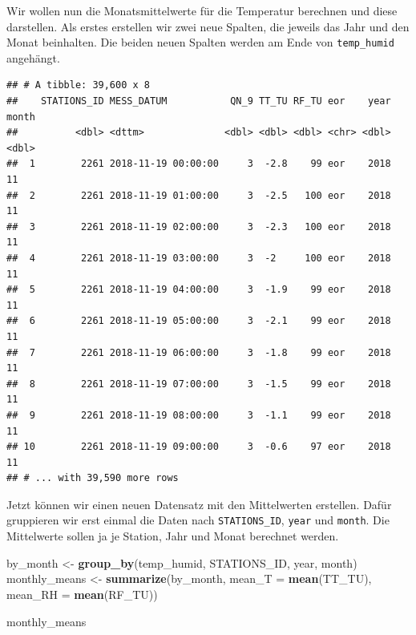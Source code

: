 \documentclass[]{book}
\newenvironment{Shaded}{\begin{snugshade}}{\end{snugshade}}
\newcommand{\DataTypeTok}[1]{\textcolor[rgb]{0.13,0.29,0.53}{#1}}
\newcommand{\KeywordTok}[1]{\textcolor[rgb]{0.13,0.29,0.53}{\textbf{#1}}}
\newcommand{\NormalTok}[1]{#1}
\newcommand{\OperatorTok}[1]{\textcolor[rgb]{0.81,0.36,0.00}{\textbf{#1}}}
\newcommand{\StringTok}[1]{\textcolor[rgb]{0.31,0.60,0.02}{#1}}
\begin{document}
Wir wollen nun die Monatsmittelwerte für die Temperatur berechnen und diese darstellen. Als erstes erstellen wir zwei neue Spalten, die jeweils das Jahr und den Monat beinhalten. Die beiden neuen Spalten werden am Ende von \texttt{temp\_humid} angehängt.

\begin{Shaded}
\end{Shaded}

\begin{verbatim}
## # A tibble: 39,600 x 8
##    STATIONS_ID MESS_DATUM           QN_9 TT_TU RF_TU eor    year month
##          <dbl> <dttm>              <dbl> <dbl> <dbl> <chr> <dbl> <dbl>
##  1        2261 2018-11-19 00:00:00     3  -2.8    99 eor    2018    11
##  2        2261 2018-11-19 01:00:00     3  -2.5   100 eor    2018    11
##  3        2261 2018-11-19 02:00:00     3  -2.3   100 eor    2018    11
##  4        2261 2018-11-19 03:00:00     3  -2     100 eor    2018    11
##  5        2261 2018-11-19 04:00:00     3  -1.9    99 eor    2018    11
##  6        2261 2018-11-19 05:00:00     3  -2.1    99 eor    2018    11
##  7        2261 2018-11-19 06:00:00     3  -1.8    99 eor    2018    11
##  8        2261 2018-11-19 07:00:00     3  -1.5    99 eor    2018    11
##  9        2261 2018-11-19 08:00:00     3  -1.1    99 eor    2018    11
## 10        2261 2018-11-19 09:00:00     3  -0.6    97 eor    2018    11
## # ... with 39,590 more rows
\end{verbatim}

Jetzt können wir einen neuen Datensatz mit den Mittelwerten erstellen. Dafür gruppieren wir erst einmal die Daten nach \texttt{STATIONS\_ID}, \texttt{year} und \texttt{month}. Die Mittelwerte sollen ja je Station, Jahr und Monat berechnet werden.

\begin{Shaded}
\begin{Highlighting}[]
\NormalTok{by_month <-}\StringTok{ }\KeywordTok{group_by}\NormalTok{(temp_humid, STATIONS_ID, year, month)}
\NormalTok{monthly_means <-}\StringTok{ }\KeywordTok{summarize}\NormalTok{(by_month, }\DataTypeTok{mean_T =} \KeywordTok{mean}\NormalTok{(TT_TU), }\DataTypeTok{mean_RH =} \KeywordTok{mean}\NormalTok{(RF_TU))}

\NormalTok{monthly_means}
\end{Highlighting}
\end{Shaded}
\end{document}
